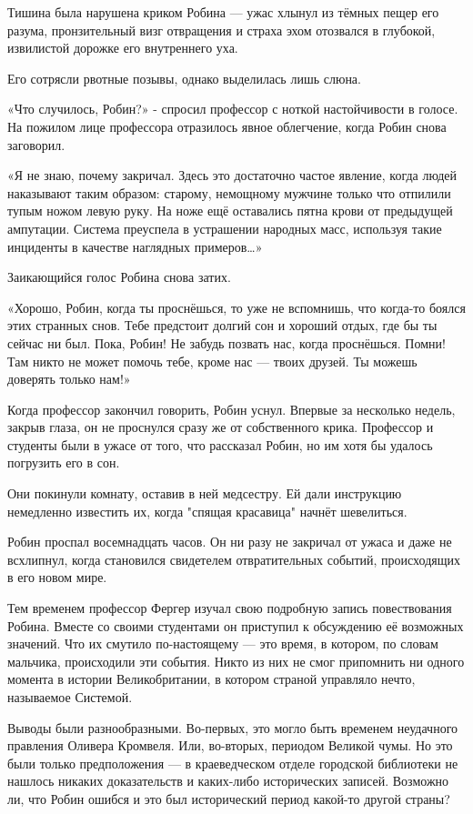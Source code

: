 \documentclass[a4paper,12pt]{book}
\begin{document}
\par
Тишина была нарушена криком Робина — ужас хлынул из тёмных пещер его разума, пронзительный визг отвращения и страха эхом отозвался в глубокой, извилистой дорожке его внутреннего уха.
\par
Его сотрясли рвотные позывы, однако выделилась лишь слюна.
\par
«Что случилось, Робин?» - спросил профессор с ноткой настойчивости в голосе. На пожилом лице профессора отразилось явное облегчение, когда Робин снова заговорил.
\par
«Я не знаю, почему закричал. Здесь это достаточно частое явление, когда людей наказывают таким образом: старому, немощному мужчине только что отпилили тупым ножом левую руку. На ноже ещё оставались пятна крови от предыдущей ампутации. Система преуспела в устрашении народных масс, используя такие инциденты в качестве наглядных примеров…»
\par
Заикающийся голос Робина снова затих.
\par
«Хорошо, Робин, когда ты проснёшься, то уже не вспомнишь, что когда-то боялся этих странных снов. Тебе предстоит долгий сон и хороший отдых, где бы ты сейчас ни был. Пока, Робин! Не забудь позвать нас, когда проснёшься. Помни! Там никто не может помочь тебе, кроме нас — твоих друзей. Ты можешь доверять только нам!»
\par
Когда профессор закончил говорить, Робин уснул. Впервые за несколько недель, закрыв глаза, он не проснулся сразу же от собственного крика. Профессор и студенты были в ужасе от того, что рассказал Робин, но им хотя бы удалось погрузить его в сон.
\par
Они покинули комнату, оставив в ней медсестру. Ей дали инструкцию немедленно известить их, когда "спящая красавица" начнёт шевелиться.
\par
Робин проспал восемнадцать часов. Он ни разу не закричал от ужаса и даже не всхлипнул, когда становился свидетелем отвратительных событий, происходящих в его новом мире.\\
\par
Тем временем профессор Фергер изучал свою подробную запись повествования Робина. Вместе со своими студентами он приступил к обсуждению её возможных значений. Что их смутило по-настоящему — это время, в котором, по словам мальчика, происходили эти события. Никто из них не смог припомнить ни одного момента в истории Великобритании, в котором страной управляло нечто, называемое Системой.
\par
Выводы были разнообразными. Во-первых, это могло быть временем неудачного правления Оливера Кромвеля. Или, во-вторых, периодом Великой чумы. Но это были только предположения — в краеведческом отделе городской библиотеки не нашлось никаких доказательств и каких-либо исторических записей. Возможно ли, что Робин ошибся и это был исторический период какой-то другой страны?\\
\end{document}
